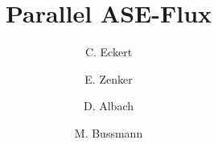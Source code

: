 \documentclass[3p,twocolumn]{elsarticle}
\begin{document}
\title{Parallel ASE-Flux}

\author[hzdr]{C. Eckert}

\author[hzdr]{E. Zenker}

\author[hzdr]{D. Albach}

\author[hzdr]{M. Bussmann}

\address[hzdr]{
  Institute of Radiation Physics, 
  Helmholtz-Zentrum Dresden-Rossendorf e. V.,
  Bautzner Landstra\ss e 400,
  01328 Dresden,  
  Germany
}



\maketitle






		


\end{document}
